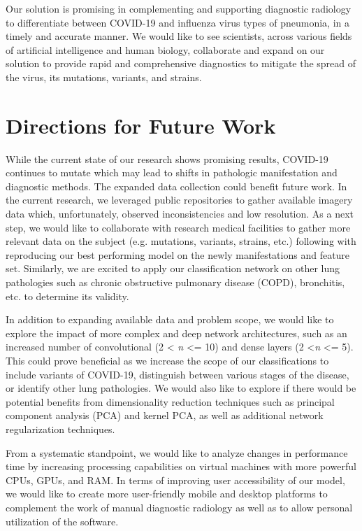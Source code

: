 \documentclass[12pt, twocolumn]{CUP-JNL-PPS}
\begin{document}
Our solution is promising in complementing and supporting diagnostic radiology to differentiate between COVID-19 and influenza virus types of pneumonia, in a timely and accurate manner. We would like to see scientists, across various fields of artificial intelligence and human biology, collaborate and expand on our solution to provide rapid and comprehensive diagnostics to mitigate the spread of the virus, its mutations, variants, and strains.

\section{Directions for Future Work}

While the current state of our research shows promising results, COVID-19 continues to mutate which may lead to shifts in pathologic manifestation and
diagnostic methods. The expanded data collection could benefit future work. In
the current research, we leveraged public repositories to gather available imagery
data which, unfortunately, observed inconsistencies and low resolution. As a next
step, we would like to collaborate with research medical facilities to gather more
relevant data on the subject (e.g. mutations, variants, strains, etc.) following with
reproducing our best performing model on the newly manifestations and feature
set. Similarly, we are excited to apply our classification network on other lung
pathologies such as chronic obstructive pulmonary disease (COPD), bronchitis,
etc. to determine its validity.

In addition to expanding available data and problem scope, we would
like to explore the impact of more complex and deep network architectures,
such as an increased number of convolutional (2 < \textit{n} <= 10) and dense layers (2 <\textit{n} <= 5). This could prove beneficial as we increase the scope of our
classifications to include variants of COVID-19, distinguish between various stages
of the disease, or identify other lung pathologies. We would also like to explore if
there would be potential benefits from dimensionality reduction techniques such as
principal component analysis (PCA) and kernel PCA, as well as additional network
regularization techniques.

From a systematic standpoint, we would like to analyze changes in
performance time by increasing processing capabilities on virtual machines with
more powerful CPUs, GPUs, and RAM. In terms of improving user accessibility
of our model, we would like to create more user-friendly mobile and desktop
platforms to complement the work of manual diagnostic radiology as well as to
allow personal utilization of the software.
\end{document}
